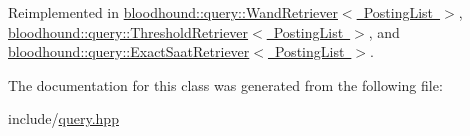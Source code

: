 Reimplemented in \mbox{\hyperlink{classbloodhound_1_1query_1_1WandRetriever_a1e593c2cddb2ca4f2415c59ca26e6a36}{bloodhound\+::query\+::\+Wand\+Retriever$<$ Posting\+List $>$}}, \mbox{\hyperlink{classbloodhound_1_1query_1_1ThresholdRetriever_aa21e5b44d70bfdf058e5f9c5a1abc008}{bloodhound\+::query\+::\+Threshold\+Retriever$<$ Posting\+List $>$}}, and \mbox{\hyperlink{classbloodhound_1_1query_1_1ExactSaatRetriever_a716838f463f124964e76f48bc37d32cc}{bloodhound\+::query\+::\+Exact\+Saat\+Retriever$<$ Posting\+List $>$}}.



The documentation for this class was generated from the following file\+:\begin{DoxyCompactItemize}
\item 
include/\mbox{\hyperlink{query_8hpp}{query.\+hpp}}\end{DoxyCompactItemize}
